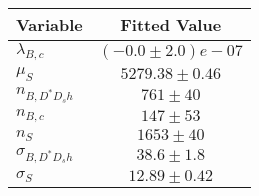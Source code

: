 \begin{tabular}[t]{lc}
\hline
Variable &Fitted Value\\
\hline\hline
$\lambda_{B,c}$&$(-0.0\pm2.0)e-07$\\
\hline
$\mu_S$&$5279.38\pm0.46$\\
\hline
$n_{B, D^* D_s h}$&$761\pm40$\\
\hline
$n_{B,c}$&$147\pm53$\\
\hline
$n_S$&$1653\pm40$\\
\hline
$\sigma_{B, D^* D_s h}$&$38.6\pm1.8$\\
\hline
$\sigma_S$&$12.89\pm0.42$\\
\hline
\end{tabular}